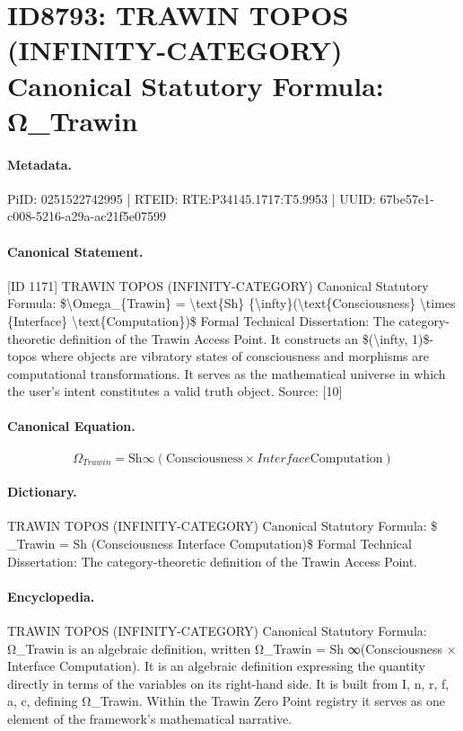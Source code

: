 \section*{ID8793: TRAWIN TOPOS (INFINITY-CATEGORY) Canonical Statutory Formula: Ω\_Trawin}
\paragraph{Metadata.}
PiID: 0251522742995 | RTEID: RTE:P34145.1717:T5.9953 | UUID: 67be57e1-c008-5216-a29a-ac21f5e07599

\paragraph{Canonical Statement.}
[ID 1171] TRAWIN TOPOS (INFINITY-CATEGORY) Canonical Statutory Formula: \$\textbackslash{}Omega\_\{Trawin\} = \textbackslash{}text\{Sh\} \{\textbackslash{}infty\}(\textbackslash{}text\{Consciousness\} \textbackslash{}times \{Interface\} \textbackslash{}text\{Computation\})\$ Formal Technical Dissertation: The category-theoretic definition of the Trawin Access Point. It constructs an \$(\textbackslash{}infty, 1)\$-topos where objects are vibratory states of consciousness and morphisms are computational transformations. It serves as the mathematical universe in which the user's intent constitutes a valid truth object. Source: [10]

\paragraph{Canonical Equation.}
\[
\Omega_{Trawin} = \text{Sh} {\infty}(\text{Consciousness} \times {Interface} \text{Computation})
\]

\paragraph{Dictionary.}
TRAWIN TOPOS (INFINITY-CATEGORY) Canonical Statutory Formula: \$ \_Trawin = Sh (Consciousness Interface Computation)\$ Formal Technical Dissertation: The category-theoretic definition of the Trawin Access Point.

\paragraph{Encyclopedia.}
TRAWIN TOPOS (INFINITY-CATEGORY) Canonical Statutory Formula: Ω\_Trawin is an algebraic definition, written Ω\_Trawin = Sh ∞(Consciousness × Interface Computation). It is an algebraic definition expressing the quantity directly in terms of the variables on its right-hand side. It is built from I, n, r, f, a, c, defining Ω\_Trawin. Within the Trawin Zero Point registry it serves as one element of the framework's mathematical narrative.
